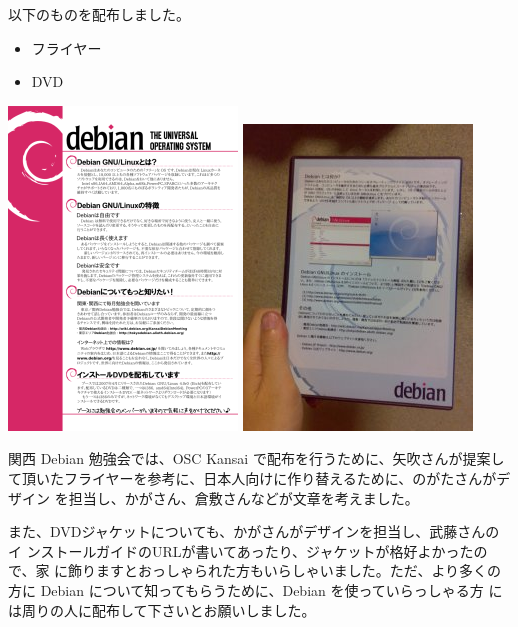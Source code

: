 \documentclass[mingoth,a4paper]{jsarticle}
\begin{document}
以下のものを配布しました。

\begin{itemize}
 \item フライヤー
 \item DVD
\end{itemize}

\begin{center}
 \includegraphics{image200708/flyer.png}
 \includegraphics{image200708/dvd.jpg} 
\end{center}

関西 Debian 勉強会では、OSC Kansai で配布を行うために、矢吹さんが提案し
て頂いたフライヤーを参考に、日本人向けに作り替えるために、のがたさんがデザイン
を担当し、かがさん、倉敷さんなどが文章を考えました。

また、DVDジャケットについても、かがさんがデザインを担当し、武藤さんのイ
ンストールガイドのURLが書いてあったり、ジャケットが格好よかったので、家
に飾りますとおっしゃられた方もいらしゃいました。ただ、より多くの方に
Debian について知ってもらうために、Debian を使っていらっしゃる方
には周りの人に配布して下さいとお願いしました。
\end{document}
